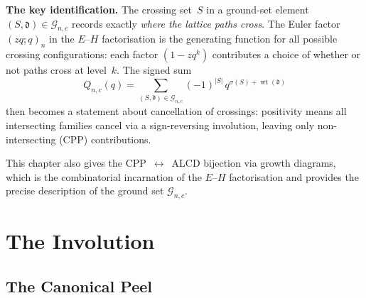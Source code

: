 \documentclass[11pt]{report}
\newcommand{\qpochn}[3]{(#1;#2)_{#3}}
\DeclareMathOperator{\wt}{wt}
\theoremstyle{plain}
\theoremstyle{definition}
\begin{document}
\medskip
\noindent
\textbf{The key identification.}\;
The crossing set~$S$ in a ground-set element
$(S, \mathfrak{d}) \in \mathcal{G}_{n,c}$ records exactly
\emph{where the lattice paths cross}.  The Euler factor
$\qpochn{zq}{q}{n}$ in the $E$--$H$ factorisation is the
generating function for all possible crossing
configurations: each factor $(1 - z q^k)$ contributes a
choice of whether or not paths cross at level~$k$.  The
signed sum
\[
  Q_{n,c}(q)
  = \sum_{(S, \mathfrak{d}) \in \mathcal{G}_{n,c}}
    (-1)^{|S|}\, q^{\sigma(S) + \wt(\mathfrak{d})}
\]
then becomes a statement about cancellation of crossings:
positivity means all intersecting families cancel via a
sign-reversing involution, leaving only non-intersecting
(CPP) contributions.

This chapter also gives the CPP~$\leftrightarrow$~ALCD
bijection via growth diagrams, which is the combinatorial
incarnation of the $E$--$H$ factorisation and provides the
precise description of the ground set $\mathcal{G}_{n,c}$.




\part{The Involution}
\label{part:involution}


\chapter{The Canonical Peel}
\label{ch:canonical-peel}
\end{document}
